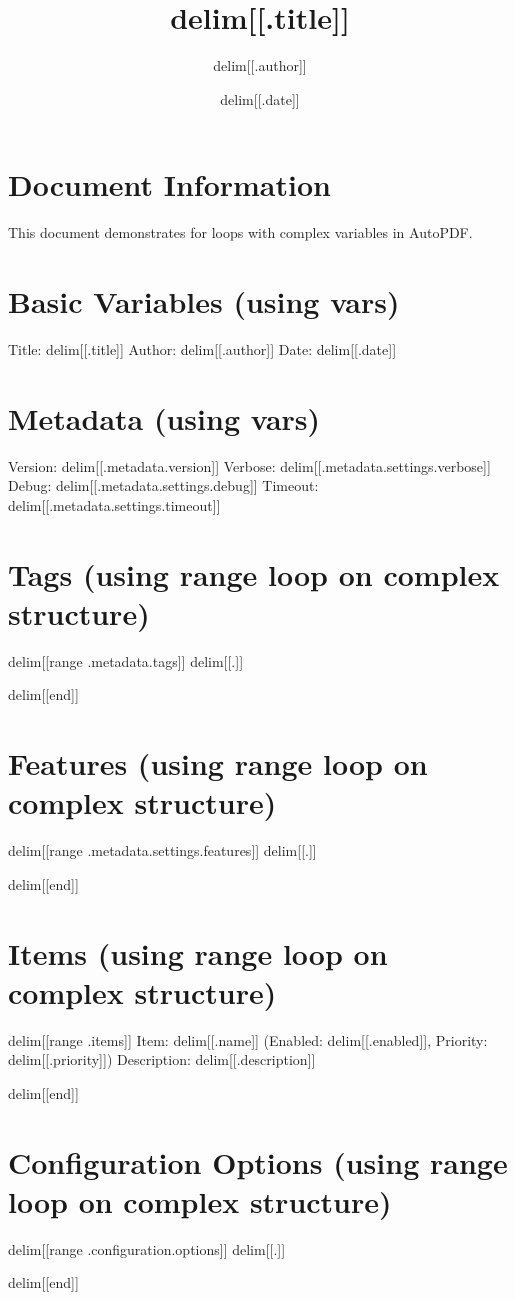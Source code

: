 \documentclass{article}
\title{delim[[.title]]}
\author{delim[[.author]]}
\date{delim[[.date]]}
\begin{document}
\maketitle

\section{Document Information}
This document demonstrates for loops with complex variables in AutoPDF.

\section{Basic Variables (using vars)}
Title: delim[[.title]]
Author: delim[[.author]]
Date: delim[[.date]]

\section{Metadata (using vars)}
Version: delim[[.metadata.version]]
Verbose: delim[[.metadata.settings.verbose]]
Debug: delim[[.metadata.settings.debug]]
Timeout: delim[[.metadata.settings.timeout]]

\section{Tags (using range loop on complex structure)}
delim[[range .metadata.tags]]
delim[[.]]\par
delim[[end]]

\section{Features (using range loop on complex structure)}
delim[[range .metadata.settings.features]]
delim[[.]]\par
delim[[end]]

\section{Items (using range loop on complex structure)}
delim[[range .items]]
Item: delim[[.name]] (Enabled: delim[[.enabled]], Priority: delim[[.priority]])
Description: delim[[.description]]\par
delim[[end]]

\section{Configuration Options (using range loop on complex structure)}
delim[[range .configuration.options]]
delim[[.]]\par
delim[[end]]
\end{document}

